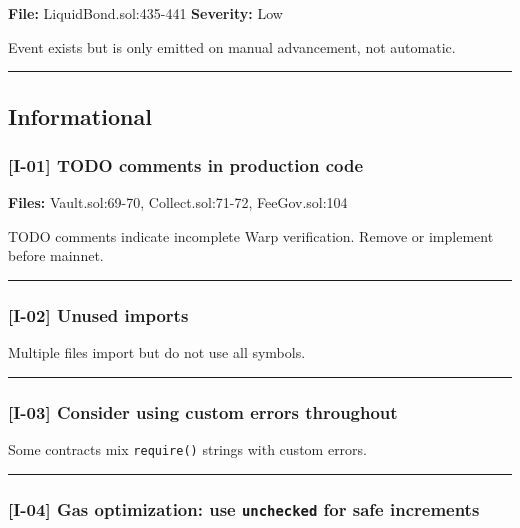 \documentclass[
]{article}
\begin{document}
\textbf{File:} LiquidBond.sol:435-441 \textbf{Severity:} Low

Event exists but is only emitted on manual advancement, not automatic.

\begin{center}\rule{0.5\linewidth}{0.5pt}\end{center}

\subsection{Informational}\label{informational}

\subsubsection{{[}I-01{]} TODO comments in production
code}\label{i-01-todo-comments-in-production-code}

\textbf{Files:} Vault.sol:69-70, Collect.sol:71-72, FeeGov.sol:104

TODO comments indicate incomplete Warp verification. Remove or implement
before mainnet.

\begin{center}\rule{0.5\linewidth}{0.5pt}\end{center}

\subsubsection{{[}I-02{]} Unused imports}\label{i-02-unused-imports}

Multiple files import but do not use all symbols.

\begin{center}\rule{0.5\linewidth}{0.5pt}\end{center}

\subsubsection{{[}I-03{]} Consider using custom errors
throughout}\label{i-03-consider-using-custom-errors-throughout}

Some contracts mix \texttt{require()} strings with custom errors.

\begin{center}\rule{0.5\linewidth}{0.5pt}\end{center}

\subsubsection{\texorpdfstring{{[}I-04{]} Gas optimization: use
\texttt{unchecked} for safe
increments}{{[}I-04{]} Gas optimization: use unchecked for safe increments}}\label{i-04-gas-optimization-use-unchecked-for-safe-increments}
\end{document}
